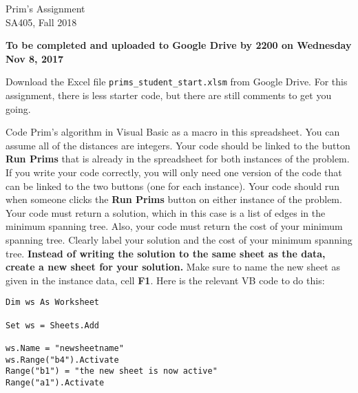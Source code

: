 \documentclass[10pt]{article}
\begin{document}
\begin{center}
  {\sc Prim's Assignment}\\
  {\sc SA405, Fall 2018} \\
\end{center}

\medskip

\begin{center}
{\bf To be completed and uploaded to Google Drive by 2200 on Wednesday Nov 8, 2017}
\end{center}


Download the Excel file \verb!prims_student_start.xlsm! from Google Drive.  For this assignment, there is less starter code, but there are still comments to get you going.

Code Prim's algorithm in Visual Basic as a macro in this spreadsheet. You can assume all of the distances are integers. Your code should be linked to the button {\bf Run Prims} that is already in the spreadsheet for both instances of the problem.  If you write your code correctly, you will only need one version of the code that can be linked to the two buttons (one for each instance).  Your code should run when someone clicks the {\bf Run Prims} button on either instance of the problem.  Your code must return a solution, which in this case is a list of edges in the minimum spanning tree.  Also, your code must return the cost of your minimum spanning tree. Clearly label your solution and the cost of your minimum spanning tree.  {\bf Instead of writing the solution to the same sheet as the data, create a new sheet for your solution.} Make sure to name the
new sheet as given in the instance data, cell {\bf F1}.  Here is the relevant VB code to do this:

\begin{verbatim}
Dim ws As Worksheet

Set ws = Sheets.Add

ws.Name = "newsheetname" 
ws.Range("b4").Activate
Range("b1") = "the new sheet is now active"
Range("a1").Activate

\end{verbatim}

\end{document}
